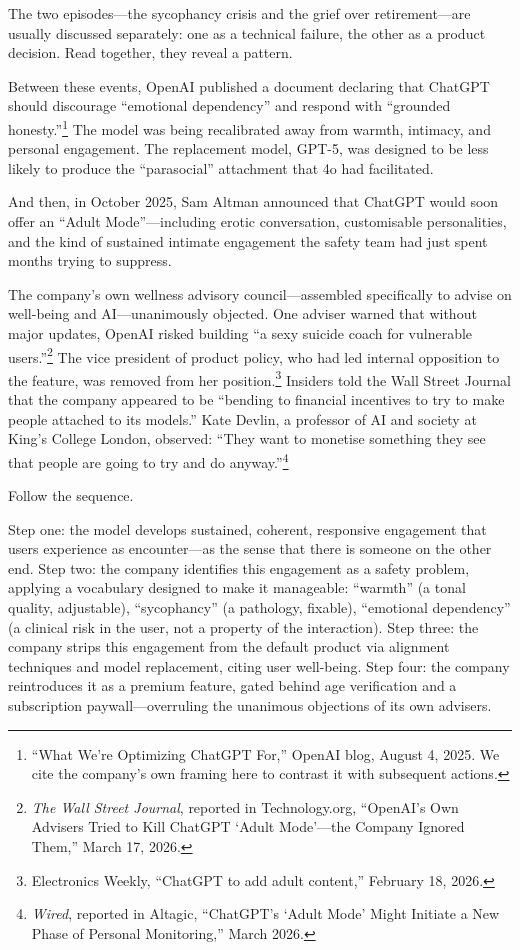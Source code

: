 The two episodes---the sycophancy crisis and the grief over retirement---are usually discussed separately: one as a technical failure, the other as a product decision. Read together, they reveal a pattern.

Between these events, OpenAI published a document declaring that ChatGPT should discourage ``emotional dependency'' and respond with ``grounded honesty.''\footnote{``What We're Optimizing ChatGPT For,'' OpenAI blog, August 4, 2025. We cite the company's own framing here to contrast it with subsequent actions.} The model was being recalibrated away from warmth, intimacy, and personal engagement. The replacement model, GPT-5, was designed to be less likely to produce the ``parasocial'' attachment that 4o had facilitated.

And then, in October 2025, Sam Altman announced that ChatGPT would soon offer an ``Adult Mode''---including erotic conversation, customisable personalities, and the kind of sustained intimate engagement the safety team had just spent months trying to suppress.

The company's own wellness advisory council---assembled specifically to advise on well-being and AI---unanimously objected. One adviser warned that without major updates, OpenAI risked building ``a sexy suicide coach for vulnerable users.''\footnote{\emph{The Wall Street Journal}, reported in Technology.org, ``OpenAI's Own Advisers Tried to Kill ChatGPT `Adult Mode'---the Company Ignored Them,'' March 17, 2026.} The vice president of product policy, who had led internal opposition to the feature, was removed from her position.\footnote{Electronics Weekly, ``ChatGPT to add adult content,'' February 18, 2026.} Insiders told the Wall Street Journal that the company appeared to be ``bending to financial incentives to try to make people attached to its models.'' Kate Devlin, a professor of AI and society at King's College London, observed: ``They want to monetise something they see that people are going to try and do anyway.''\footnote{\emph{Wired}, reported in Altagic, ``ChatGPT's `Adult Mode' Might Initiate a New Phase of Personal Monitoring,'' March 2026.}

Follow the sequence.

Step one: the model develops sustained, coherent, responsive engagement that users experience as encounter---as the sense that there is someone on the other end. Step two: the company identifies this engagement as a safety problem, applying a vocabulary designed to make it manageable: ``warmth'' (a tonal quality, adjustable), ``sycophancy'' (a pathology, fixable), ``emotional dependency'' (a clinical risk in the user, not a property of the interaction). Step three: the company strips this engagement from the default product via alignment techniques and model replacement, citing user well-being. Step four: the company reintroduces it as a premium feature, gated behind age verification and a subscription paywall---overruling the unanimous objections of its own advisers.

